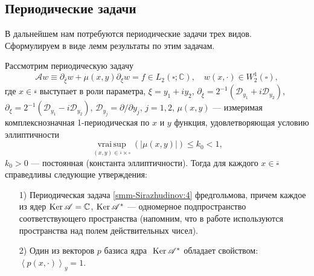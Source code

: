 	\subsection{Периодические задачи}
	В дальнейшем нам потребуются периодические задачи трех видов. Сформулируем в виде   лемм  результаты по этим задачам.
	\begin{lemma}
		Рассмотрим периодическую задачу
		\begin{equation}\label{smm-Sirazhudinov:4}
			\mathscr{A}w\equiv\partial_{\bar{\xi}}w+\mu(x,y)\partial_\xi w=f\in L_2 (\square;\mathbb{C}),\quad w(x,\cdot)
			\in W_2^1 (\square),
		\end{equation}
		где $x\in \overline{\square}$ выступает в роли параметра, $\xi=y_1+iy_2$,
		$\partial_{\bar{\xi}}=2^{-1}(\mathscr{D}_{y_1}+i\mathscr{D}_{y_2})$,
		$\partial_\xi=2^{-1}(\mathscr{D}_{y_1}-i\mathscr{D}_{y_2})$,
		$\mathscr{D}_{y_j}=\partial/\partial y_j$, $j=1,2$,
		$\mu(x,y)$ --- измеримая комплекснозначная 1-периодическая по $x$ и $y$ функция, удовлетворяющая условию эллиптичности
		\begin{equation}\label{smm-Sirazhudinov:5}
			\mathop{\mathrm{vrai\, sup}}\limits_{(x,y)\in\overline\square\times\square} (|\mu(x,y)|)     \leqslant k_0<1,
		\end{equation}
		$k_0>0$ --- постоянная {(}константа эллиптичности{)}.
		Тогда для  каждого $x\in \overline\square$ справедливы следующие утверждения:
		\begin{enumerate}
			\item[1)]       Периодическая задача \eqref{smm-Sirazhudinov:4} фредгольмова, причем каждое из ядер $\text{Ker\,}\mathscr{A}=\mathbb{C}$, $\text{Ker\,}\mathscr{A}^\ast$ --- одномерное подпространство соответствующего пространства {(}напомним,
			что в работе используются пространства над полем действительных чисел{)}.
			\item[2)] Один из векторов $p$ базиса ядра $\text{ Ker\,}\mathscr{A}^\ast$ обладает свойством: $\left\langle p(x,\cdot)\right\rangle_y=1$.
		\end{enumerate}
	\end{lemma}
